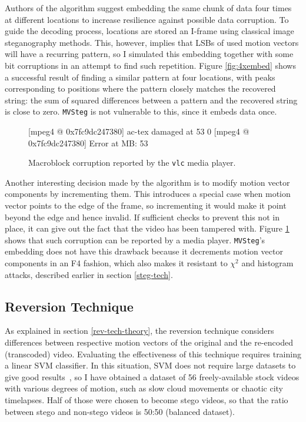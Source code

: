 \documentclass[12pt,british,twoside,notitlepage,usenames,dvipsnames,hypens,final]{report}
\numberwithin{equation}{section}
\numberwithin{figure}{section}
\renewenvironment{alltt}{\vspace{-0.6\baselineskip}\begin{oldalltt}}{\end{oldalltt}\vspace{-0.1\baselineskip}}
\begin{document}
Authors of the algorithm suggest embedding the same chunk of data four times at different locations to increase resilience against possible data corruption. To guide the decoding process, locations are stored an I-frame using classical image steganography methods. This, however, implies that LSBs of used motion vectors will have a recurring pattern, so I simulated this embedding together with some bit corruptions in an attempt to find such repetition. Figure \ref{fig:4xembed} shows a successful result of finding a similar pattern at four locations, with peaks corresponding to positions where the pattern closely matches the recovered string: the sum of squared differences between a pattern and the recovered string is close to zero. \texttt{MVSteg} is not vulnerable to this, since it embeds data once.

\begin{figure}
\begingroup
    \fontsize{10pt}{12pt}\selectfont
\centering
\begin{alltt}
{\color{blue}[mpeg4 @ 0x7fc9dc247380]} {\color{red}ac-tex damaged at 53 0}
{\color{blue}[mpeg4 @ 0x7fc9dc247380]} {\color{red}Error at MB: 53}
\end{alltt}
\endgroup
\caption{Macroblock corruption reported by the \texttt{vlc} media player.}
\label{fig:vlc-corruption}
\end{figure}

Another interesting decision made by the algorithm is to modify motion vector components by incrementing them. This introduces a special case when motion vector points to the edge of the frame, so incrementing it would make it point beyond the edge and hence invalid. If sufficient checks to prevent this not in place, it can give out the fact that the video has been tampered with. Figure \ref{fig:vlc-corruption} shows that such corruption can be reported by a media player. \texttt{MVSteg}'s embedding does not have this drawback because it decrements motion vector components in an F4 fashion, which also makes it resistant to $\chi^2$ and histogram attacks, described earlier in section \ref{steg-tech}.

\subsection{Reversion Technique}
\label{rev-tech}

As explained in section \ref{rev-tech-theory}, the reversion technique considers differences between respective motion vectors of the original and the re-encoded (transcoded) video. Evaluating the effectiveness of this technique requires training a linear SVM classifier. In this situation, SVM does not require large datasets to give good results~\cite{cao2012video}, so I have obtained a dataset of 56 freely-available stock videos with various degrees of motion, such as slow cloud movements or chaotic city timelapses. Half of those were chosen to become stego videos, so that the ratio between stego and non-stego videos is 50:50 (balanced dataset).
\end{document}
